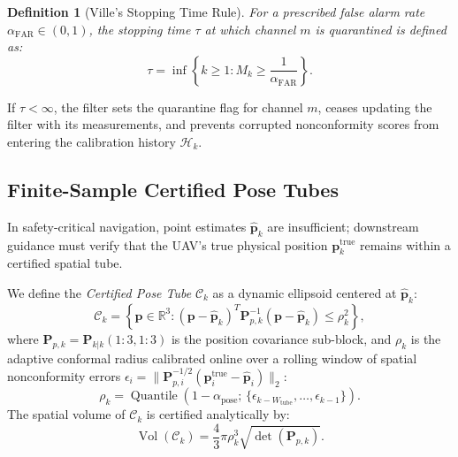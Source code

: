 \documentclass[journal,twocolumn]{IEEEtran}
\newtheorem{definition}{Definition}
\newcommand{\R}{\mathbb{R}}
\begin{document}
\begin{definition}[Ville's Stopping Time Rule]
For a prescribed false alarm rate $\alpha_{\mathrm{FAR}} \in (0, 1)$, the stopping time $\tau$ at which channel $m$ is quarantined is defined as:
\begin{equation}
    \tau = \inf \left\{ k \ge 1 : M_k \ge \frac{1}{\alpha_{\mathrm{FAR}}} \right\}.
    \label{eq:villes_stopping_time}
\end{equation}
\end{definition}

If $\tau < \infty$, the filter sets the quarantine flag for channel $m$, ceases updating the filter with its measurements, and prevents corrupted nonconformity scores from entering the calibration history $\mathcal{H}_k$.

\subsection{Finite-Sample Certified Pose Tubes}
In safety-critical navigation, point estimates $\hat{\mathbf{p}}_k$ are insufficient; downstream guidance must verify that the UAV's true physical position $\mathbf{p}_k^{\text{true}}$ remains within a certified spatial tube.

We define the \emph{Certified Pose Tube} $\mathcal{C}_k$ as a dynamic ellipsoid centered at $\hat{\mathbf{p}}_k$:
\begin{equation}
    \mathcal{C}_k = \left\{ \mathbf{p} \in \R^3 : (\mathbf{p} - \hat{\mathbf{p}}_k)^T \mathbf{P}_{p,k}^{-1} (\mathbf{p} - \hat{\mathbf{p}}_k) \le \rho_k^2 \right\},
    \label{eq:pose_tube}
\end{equation}
where $\mathbf{P}_{p,k} = \mathbf{P}_{k|k}(1:3, 1:3)$ is the position covariance sub-block, and $\rho_k$ is the adaptive conformal radius calibrated online over a rolling window of spatial nonconformity errors $\epsilon_i = \|\mathbf{P}_{p,i}^{-1/2} (\mathbf{p}_i^{\text{true}} - \hat{\mathbf{p}}_i)\|_2$:
\begin{equation}
    \rho_k = \operatorname{Quantile}\left( 1 - \alpha_{\text{pose}} ;\, \{\epsilon_{k-W_{\text{tube}}}, \dots, \epsilon_{k-1}\} \right).
    \label{eq:tube_radius}
\end{equation}
The spatial volume of $\mathcal{C}_k$ is certified analytically by:
\begin{equation}
    \operatorname{Vol}(\mathcal{C}_k) = \frac{4}{3} \pi \rho_k^3 \sqrt{\det(\mathbf{P}_{p,k})}.
\end{equation}
\end{document}
